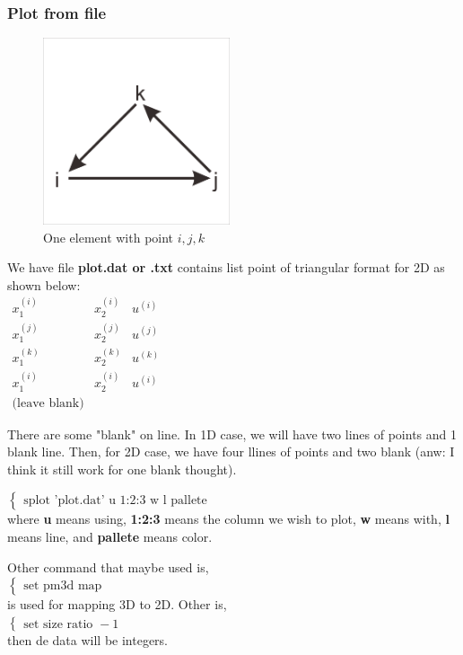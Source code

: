 \documentclass[a4paper,10pt]{article}
\begin{document}
\newpage
\subsubsection{Plot from file}
\begin{figure}
	\includegraphics[width=5.5cm]{"picture/triangular format"}
	\caption{One element with point $ i,j,k $}
	\label{fig:triangular-format}
\end{figure}

We have file \textbf{plot.dat or .txt} contains list point of triangular format for 2D as shown below:\\
$ \begin{matrix}
	x^{(i)}_{1} & x^{(i)}_{2} & u^{(i)} \\
	x^{(j)}_{1} & x^{(j)}_{2} & u^{(j)} \\
	x^{(k)}_{1} & x^{(k)}_{2} & u^{(k)} \\
	x^{(i)}_{1} & x^{(i)}_{2} & u^{(i)} \\
	\text{(leave blank)}
\end{matrix} $

There are some "blank" on line. In 1D case, we will have two lines of points and 1 blank line. Then, for 2D case, we have four llines of points and two blank (anw: I think it still work for one blank thought).

$ \begin{cases}
\text{splot 'plot.dat' u 1:2:3 w l pallete}
\end{cases} $ \\
where \textbf{u} means using, \textbf{1:2:3} means the column we wish to plot, \textbf{w} means with, \textbf{l} means line, and \textbf{pallete} means color.

Other command that maybe used is,\\
$ \begin{cases}
\text{set pm3d map}
\end{cases} $\\
is used for mapping 3D to 2D. Other is,\\
$ \begin{cases}
\text{set size ratio } -1
\end{cases} $\\
then de data will be integers.
\end{document}
